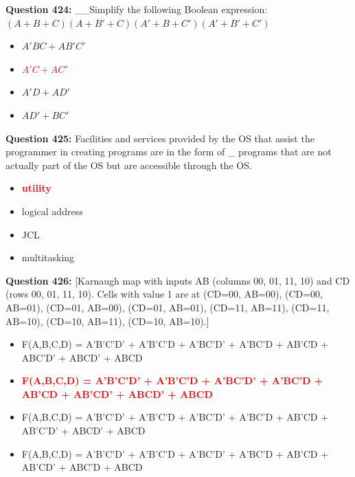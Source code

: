 \documentclass[12pt,a4paper]{article}
\begin{document}
\vspace{0.5cm}

\textbf{Question 424:} __Simplify the following Boolean expression: $(A + B + C)(A + B' + C)(A' + B + C')(A' + B' + C')$

\begin{itemize}
    \item[\textbf{A.}] $A'BC + AB'C'$
    \item[\textbf{B.}] \textcolor{red}{\textbf{$A'C + AC'$}}
    \item[\textbf{C.}] $A'D + AD'$
    \item[\textbf{D.}] $AD' + BC'$
\end{itemize}

\vspace{0.5cm}

\textbf{Question 425:} Facilities and services provided by the OS that assist the programmer in creating programs are in the form of _ programs that are not actually part of the OS but are accessible through the OS.

\begin{itemize}
    \item[\textbf{A.}] \textcolor{red}{\textbf{utility}}
    \item[\textbf{B.}] logical address
    \item[\textbf{C.}] JCL
    \item[\textbf{D.}] multitasking
\end{itemize}

\vspace{0.5cm}

\textbf{Question 426:} [Karnaugh map with inputs AB (columns 00, 01, 11, 10) and CD (rows 00, 01, 11, 10). Cells with value 1 are at (CD=00, AB=00), (CD=00, AB=01), (CD=01, AB=00), (CD=01, AB=01), (CD=11, AB=11), (CD=11, AB=10), (CD=10, AB=11), (CD=10, AB=10).]

\begin{itemize}
    \item[\textbf{A.}] F(A,B,C,D) = A'B'C'D' + A'B'C'D + A'BC'D' + A'BC'D + AB'CD + ABC'D' + ABCD' + ABCD
    \item[\textbf{B.}] \textcolor{red}{\textbf{F(A,B,C,D) = A'B'C'D' + A'B'C'D + A'BC'D' + A'BC'D + AB'CD + AB'CD' + ABCD' + ABCD}}
    \item[\textbf{C.}] F(A,B,C,D) = A'B'C'D' + A'B'C'D + A'BC'D' + A'BC'D + AB'CD + AB'C'D' + ABCD' + ABCD
    \item[\textbf{D.}] F(A,B,C,D) = A'B'C'D' + A'B'C'D + A'BC'D' + A'BC'D + AB'CD + AB'CD' + ABC'D + ABCD
\end{itemize}
\end{document}
